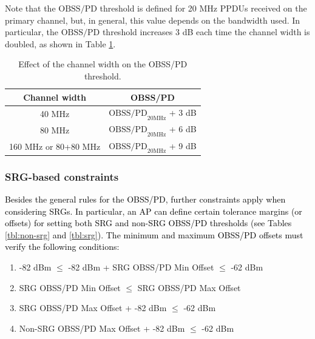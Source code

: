 \documentclass{ieeeaccess}
\begin{document}
Note that the $\text{OBSS/PD}$ threshold is defined for 20 MHz PPDUs received on the primary channel, but, in general, this value depends on the bandwidth used. In particular, the $\text{OBSS/PD}$ threshold increases 3 dB each time the channel width is doubled, as shown in Table \ref{tbl:sensitivity_channel_width}.
\begin{table}[ht!]
	\centering
	\begin{tabular}{|c|c|}
		\hline
		\textbf{Channel width} & \textbf{OBSS/PD} \\ \hline
		40 MHz & $\text{OBSS/PD}_{20 \text{MHz}}$ + 3 dB \\ \hline
		80 MHz & $\text{OBSS/PD}_{20 \text{MHz}}$ + 6 dB \\ \hline
		160 MHz or 80+80 MHz &  $\text{OBSS/PD}_{20 \text{MHz}}$ + 9 dB \\ \hline
	\end{tabular}
	\caption{Effect of the channel width on the OBSS/PD threshold.}
	\label{tbl:sensitivity_channel_width}
\end{table}

\subsubsection{SRG-based constraints}	
\textcolor{black}{Besides the general rules for the OBSS/PD, further constraints apply when considering SRGs. In particular, an AP can define certain tolerance margins (or offsets) for setting both SRG and non-SRG OBSS/PD thresholds (see Tables \ref{tbl:non-srg} and \ref{tbl:srg}). The minimum and maximum OBSS/PD offsets must verify the following conditions:}
\begin{enumerate}
	\item -82 dBm $\leq$ -82 dBm + SRG OBSS/PD Min Offset $\leq$ -62 dBm 
	\item SRG OBSS/PD Min Offset $\leq$ SRG OBSS/PD Max Offset
	\item SRG OBSS/PD Max Offset + -82 dBm $\leq$ -62 dBm 
	\item Non-SRG OBSS/PD Max Offset + -82 dBm $\leq$  -62 dBm
\end{enumerate}
\end{document}
